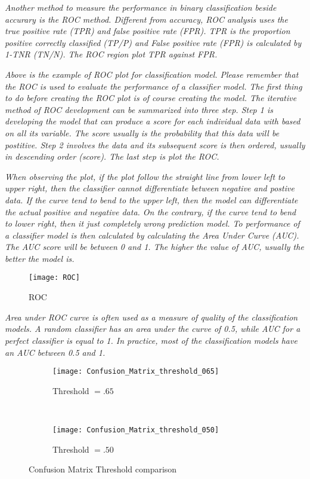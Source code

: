 \textit{Another method to measure the performance in binary classification beside accurary is the ROC method. Different from accuracy, ROC analysis uses the true positive rate (TPR) and false positive rate (FPR). TPR is the proportion positive correctly classified (TP/P) and  False positive rate (FPR) is calculated by 1-TNR (TN/N). The ROC region plot TPR against FPR.}

\textit{Above is the example of ROC plot for classification model. Please remember that the ROC is used to evaluate the performance of a classifier model. The first thing to do before creating the ROC plot is of course creating the model. The iterative method of ROC development can be summarized into three step. Step 1 is developing the model that can produce a score for each individual data with based on all its variable. The score usually is the probability that this data will be postitive. Step 2 involves the data and its subsequent score is then ordered, usually in descending order (score). The last step is plot the ROC.}

\textit{When observing the plot, if the plot follow the straight line from lower left to upper right, then the classifier cannot differentiate between negative and postive data. If the curve tend to bend to the upper left, then the model can differentiate the actual positive and negative data. On the contrary, if the curve tend to bend to lower right, then it just completely wrong prediction model.
To performance of a classifier model is then calculated by calculating the Area Under Curve (AUC). The AUC score will be between 0 and 1. The higher the value of AUC, usually the better the model is.}

\begin{figure}[H]
	\texttt{[image: ROC]}
	\caption[ROC]
	{ROC}
	\label{fig:ROC}
\end{figure}

\textit{Area under ROC curve is often used as a measure of quality of the classification models. A random classifier has an area under the curve of 0.5, while AUC for a perfect classifier is equal to 1. In practice, most of the classification models have an AUC between 0.5 and 1.}

\begin{figure}[H]
	\centering
	\begin{subfigure}[b]{0.45\textwidth}
		\captionsetup{font=scriptsize}
		\texttt{[image: Confusion\_Matrix\_threshold\_065]}
		\caption{Threshold $=.65$}\label{fig:Threshold65}
	\end{subfigure} ~\quad
	\begin{subfigure}[b]{0.45\textwidth}
		\captionsetup{font=scriptsize}
		\texttt{[image: Confusion\_Matrix\_threshold\_050]}
		\caption{Threshold $=.50$}\label{fig:Threshold50}
	\end{subfigure}
	\caption{Confusion Matrix Threshold comparison}
	\label{fig:matric_compare}
\end{figure}

